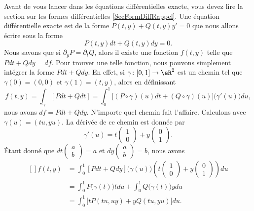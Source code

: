 Avant de vous lancer dans les équations différentielles exacte, vous devez lire la section sur les formes différentielles \ref{SecFormDiffRappel}. Une équation différentielle exacte est de la forme $P(t,y)+Q(t,y)y'=0$ que nous allons écrire sous la forme
\begin{equation}		\label{EqExacteDiff}
	P(t,y)dt+Q(t,y)dy=0.
\end{equation}
Nous savons que si $\partial_yP=\partial_tQ$, alors il existe une fonction $f(t,y)$ telle que $Pdt+Qdy=df$. Pour trouver une telle fonction, nous pouvons simplement intégrer la forme $Pdt+Qdy$. En effet, si $\gamma\colon [0,1]\to \eR^2$ est un chemin tel que $\gamma(0)=(0,0)$ et $\gamma(1)=(t,y)$, alors en définissant
\begin{equation}
	f(t,y)=\int_{\gamma}[Pdt+Qdt]=\int_{0}^1\big[ (P\circ\gamma)(u)dt+(Q\circ\gamma)(u) \big]\big( \gamma'(u) \big)du,
\end{equation}
nous avons $df=Pdt+Qdy$. N'importe quel chemin fait l'affaire. Calculons avec $\gamma(u)=(tu,yu)$. La dérivée de ce chemin est donnée par
\begin{equation}
	\gamma'(u)=t\begin{pmatrix}
	1	\\ 
	0	
\end{pmatrix}+y\begin{pmatrix}
	0	\\ 
	1	
\end{pmatrix}.
\end{equation}
Étant donné que $dt\begin{pmatrix}
	a	\\ 
	b	
\end{pmatrix}=a$ et $dy\begin{pmatrix}
	a	\\ 
	b	
\end{pmatrix}=b$, nous avons
\begin{equation}
	\begin{aligned}[]
	f(t,y)&=\int_0^1[Pdt+Qdy]\big( \gamma(u) \big)\left( t\begin{pmatrix}
	1	\\ 
	0	
\end{pmatrix}+y\begin{pmatrix}
	0	\\ 
	1	
\end{pmatrix} \right)du\\
		&=\int_0^1P\big( \gamma(t) \big)tdu+\int_0^1Q\big( \gamma(t) \big)ydu\\
		&=\int_0^1\big[ tP(tu,uy)+yQ(tu,yu) \big]du.
	\end{aligned}
\end{equation}
